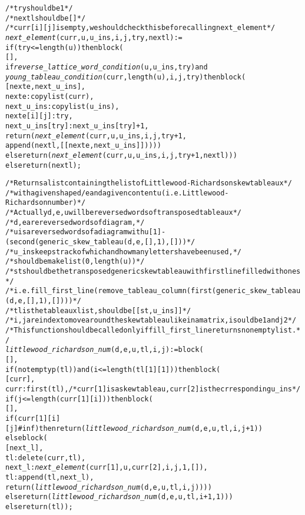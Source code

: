 \begin{alltt}
/* try should be 1 */
/* nextl should be [] */
/* curr[i][j] is empty, we should check this before calling next\_element */
\emph{next\_element} (curr, u, u\_ins, i, j, try, nextl) :=
if (try <= length (u)) then block (
  [],
  if \emph{reverse\_lattice\_word\_condition} (u, u\_ins, try) and
     \emph{young\_tableau\_condition} (curr, length (u), i, j, try) then block (
    [nexte, next\_u\_ins],
    nexte : copylist (curr),
    next\_u\_ins : copylist (u\_ins),
    nexte[i][j] : try,
    next\_u\_ins[try] : next\_u\_ins[try] + 1,
    return (\emph{next\_element} (curr, u, u_ins, i, j, try + 1, 
      append (nextl, [[nexte, next\_u\_ins]]))))
  else return (\emph{next\_element} (curr, u, u\_ins, i, j, try + 1, nextl)))
else return (nextl); 

/* Returns a list containing the list of Littlewood-Richardson skew tableaux */
/* with a given shape d/e and a given content u (i.e. Littlewood-Richardson number) */
/* Actually d,e,u will be reversed words of transposed tableaux */
/* d,e are reversed words of diagram, */
/* u is a reversed words of a diagram with u[1]-(second (generic\_skew\_tableau (d, e, [], 1), [])) */
/* u\_ins keeps track of which and how many letters have been used,*/
/* should be makelist (0, length (u)) */
/* st should be the transposed generic skew tableau with first line filled with ones */
/* i.e. fill\_first\_line (remove\_tableau\_column (first (generic\_skew\_tableau (d, e, [], 1), []))) */
/* tl is the tableaux list, should be [[st, u\_ins]] */
/* i,j are index to move around the skew tableau like in a matrix, i sould be 1 and j 2 */
/* This function should be called only if fill\_first\_line returns non empty list. */
\emph{littlewood\_richardson\_num} (d, e, u, tl, i, j) := block (
  [],
  if (not emptyp (tl)) and (i <= length (tl[1][1]))then block (
    [curr],
    curr : first (tl), /* curr[1] is a skew tableau, curr[2] is the crresponding u\_ins */
    if (j <= length (curr[1][i])) then block (
      [],
      if (curr[1][i][j] # inf) then return (\emph{littlewood\_richardson\_num} (d, e, u, tl, i, j+1))
      else block (
        [next\_l],
        tl : delete (curr, tl),
        next\_l : \emph{next\_element} (curr[1], u, curr[2], i, j, 1, []),
        tl : append (tl, next\_l),
        return (\emph{littlewood\_richardson\_num} (d, e, u, tl, i, j))))
    else return (\emph{littlewood\_richardson\_num} (d, e, u, tl, i+1, 1)))
  else return (tl));
\end{alltt}
\normalsize
